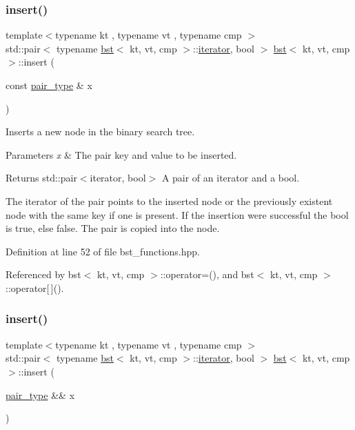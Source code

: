 \subsubsection{\texorpdfstring{insert()}{insert()}\hspace{0.1cm}{\footnotesize\ttfamily [1/2]}}
{\footnotesize\ttfamily template$<$typename kt , typename vt , typename cmp $>$ \\
std\+::pair$<$ typename \hyperlink{classbst}{bst}$<$ kt, vt, cmp $>$\+::\hyperlink{classbst_a429b0445783ff6486882db5dee900ce0}{iterator}, bool $>$ \hyperlink{classbst}{bst}$<$ kt, vt, cmp $>$\+::insert (\begin{DoxyParamCaption}\item[{const \hyperlink{classbst_a7b11cca2a3b4394915600194f741ab16}{pair\+\_\+type} \&}]{x }\end{DoxyParamCaption})}



Inserts a new node in the binary search tree. 


\begin{DoxyParams}{Parameters}
{\em x} & The pair key and value to be inserted. \\
\hline
\end{DoxyParams}
\begin{DoxyReturn}{Returns}
std\+::pair$<$iterator, bool$>$ A pair of an iterator and a bool.
\end{DoxyReturn}
The iterator of the pair points to the inserted node or the previously existent node with the same key if one is present. If the insertion were successful the bool is true, else false. The pair is copied into the node. 

Definition at line 52 of file bst\+\_\+functions.\+hpp.



Referenced by bst$<$ kt, vt, cmp $>$\+::operator=(), and bst$<$ kt, vt, cmp $>$\+::operator\mbox{[}$\,$\mbox{]}().

\mbox{\label{classbst_aafe95673b19139abd52e242e5d72b66d}} 
\subsubsection{\texorpdfstring{insert()}{insert()}\hspace{0.1cm}{\footnotesize\ttfamily [2/2]}}
{\footnotesize\ttfamily template$<$typename kt , typename vt , typename cmp $>$ \\
std\+::pair$<$ typename \hyperlink{classbst}{bst}$<$ kt, vt, cmp $>$\+::\hyperlink{classbst_a429b0445783ff6486882db5dee900ce0}{iterator}, bool $>$ \hyperlink{classbst}{bst}$<$ kt, vt, cmp $>$\+::insert (\begin{DoxyParamCaption}\item[{\hyperlink{classbst_a7b11cca2a3b4394915600194f741ab16}{pair\+\_\+type} \&\&}]{x }\end{DoxyParamCaption})\hspace{0.3cm}{\ttfamily [noexcept]}}



